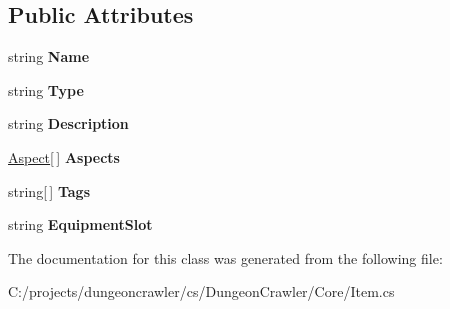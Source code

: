 \subsection*{Public Attributes}
\begin{DoxyCompactItemize}
\item 
\hypertarget{class_dungeon_crawler_1_1_core_1_1_item_ab24f9d839ae3b24d3dbbceffa8617764}{}string {\bfseries Name}\label{class_dungeon_crawler_1_1_core_1_1_item_ab24f9d839ae3b24d3dbbceffa8617764}

\item 
\hypertarget{class_dungeon_crawler_1_1_core_1_1_item_ae0ff9e4d2f934728bdca61c6c2d92ce4}{}string {\bfseries Type}\label{class_dungeon_crawler_1_1_core_1_1_item_ae0ff9e4d2f934728bdca61c6c2d92ce4}

\item 
\hypertarget{class_dungeon_crawler_1_1_core_1_1_item_a769192440a23ac6b6f33634659dcc4a6}{}string {\bfseries Description}\label{class_dungeon_crawler_1_1_core_1_1_item_a769192440a23ac6b6f33634659dcc4a6}

\item 
\hypertarget{class_dungeon_crawler_1_1_core_1_1_item_af11c39625f65ca6261e749a9d4119c61}{}\hyperlink{class_dungeon_crawler_1_1_core_1_1_aspect}{Aspect}\mbox{[}$\,$\mbox{]} {\bfseries Aspects}\label{class_dungeon_crawler_1_1_core_1_1_item_af11c39625f65ca6261e749a9d4119c61}

\item 
\hypertarget{class_dungeon_crawler_1_1_core_1_1_item_a9b5424ecb05cba5b5e96db05de4bf71e}{}string\mbox{[}$\,$\mbox{]} {\bfseries Tags}\label{class_dungeon_crawler_1_1_core_1_1_item_a9b5424ecb05cba5b5e96db05de4bf71e}

\item 
\hypertarget{class_dungeon_crawler_1_1_core_1_1_item_a6d0c7b4ba5b26317ec7b5491f0f03501}{}string {\bfseries Equipment\+Slot}\label{class_dungeon_crawler_1_1_core_1_1_item_a6d0c7b4ba5b26317ec7b5491f0f03501}

\end{DoxyCompactItemize}


The documentation for this class was generated from the following file\+:\begin{DoxyCompactItemize}
\item 
C\+:/projects/dungeoncrawler/cs/\+Dungeon\+Crawler/\+Core/Item.\+cs\end{DoxyCompactItemize}
